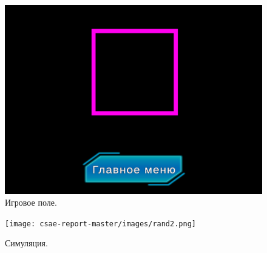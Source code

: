 \begin{figure}[H]
	\centering
	\includegraphics[width=1\textwidth]{images/map.png}  
	\caption{Игровое поле.}
	\label{map}
\end{figure}

\begin{figure}[H]
	\centering
	\texttt{[image: csae-report-master/images/rand2.png]}  
	\caption{Симуляция.}
	\label{uim}
\end{figure}